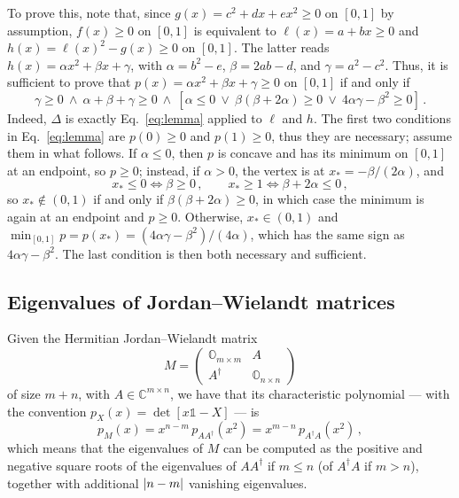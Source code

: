 \documentclass[a4paper,11pt]{article}
\begin{document}
To prove this, note that,
since $g(x)=c^2 + dx + ex^2 \ge 0$ on $[0,1]$ by assumption, $f(x) \ge 0$ on $[0,1]$ is equivalent to $\ell(x) = a + bx \ge 0$ and $h(x) = \ell(x)^2 -g(x) \ge 0$ on $[0,1]$. The latter reads $h(x) = \alpha x^2 + \beta x + \gamma$, with $\alpha = b^2-e$, $\beta = 2ab-d$, and $\gamma=a^2-c^2$.
Thus, it is sufficient to prove that $p(x) = \alpha x^2+\beta x + \gamma \ge 0$ on $[0,1]$ if and only if
    \begin{equation}\label{eq:lemma}
        \gamma\ge0 \ \land \ \alpha+\beta+\gamma\ge0 \ \land \
    [\alpha\le0 \ \lor \ \beta(\beta+2\alpha)\ge0 \ \lor \ 4\alpha\gamma-\beta^2\ge0 ] \,.
    \end{equation}
Indeed, $\Delta$ is exactly Eq.~\eqref{eq:lemma} applied to $\ell$ and $h$.
The first two conditions in Eq.~\eqref{eq:lemma} are $p(0)\ge 0$ and $p(1)\ge 0$, thus they are necessary; assume them in what follows. If $\alpha \le 0$, then $p$ is concave and has its minimum on $[0,1]$ at an endpoint, so $p\ge 0$; instead, if $\alpha >0$, the vertex is at $x_\ast = -\beta/(2\alpha)$, and
\begin{equation}
    x_\ast\le0 \iff \beta\ge0 \,, \qquad x_\ast\ge1 \iff \beta+2\alpha\le0 \,,
\end{equation}
so $x_\ast \notin (0,1)$ if and only if $\beta(\beta+2\alpha)\ge 0$, in which case the minimum is again at an endpoint and $p\ge 0$. Otherwise, $x_\ast \in (0,1)$ and $\min_{[0,1]} p = p(x_\ast) = (4\alpha\gamma-\beta^2)/(4\alpha)$, which has the same sign as $4\alpha\gamma-\beta^2$. The last condition is then both necessary and sufficient. 

\subsection{Eigenvalues of Jordan--Wielandt matrices}
Given the Hermitian Jordan--Wielandt matrix
\begin{equation}
    M=\begin{pmatrix}
        \mathbb{O}_{m\times m} & A \\ A^\dag & \mathbb{O}_{n\times n}
    \end{pmatrix}
\end{equation}
of size $m+n$,
with $A\in \mathbb{C}^{m \times n}$,
we have that its characteristic polynomial --- with the convention $p_X(x) = \det[x\mathbb{1}-X]$ --- is
\begin{equation}
    p_M(x)=x^{n-m}\,p_{AA^\dag}(x^2) = x^{m-n}\,p_{A^\dag A}(x^2) \,,
\end{equation}
which means that the eigenvalues of $M$ can be computed as the positive and negative square roots of the eigenvalues of $AA^\dag$ if $m\le n$ (of $A^\dag A$ if $m > n$), together with additional $\abs{n-m}$ vanishing eigenvalues. 
%
\end{document}

